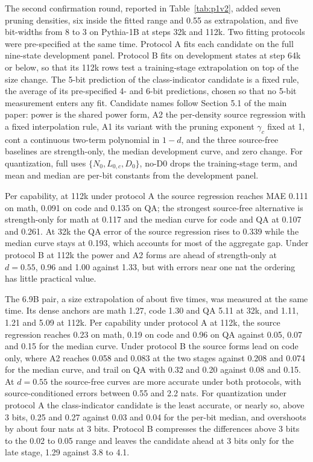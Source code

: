 The second confirmation round, reported in Table~\ref{tab:p1v2}, added seven pruning densities, six inside the fitted range and 0.55 as extrapolation, and five bit-widths from 8 to 3 on Pythia-1B at
steps 32k and 112k. Two fitting protocols were pre-specified at the same time.
Protocol A fits each candidate on the full nine-state development
panel. Protocol B fits on development states at step 64k or below, so
that its 112k rows test a training-stage extrapolation on top of the
size change. The 5-bit prediction of the class-indicator candidate is a
fixed rule, the average of its pre-specified 4- and 6-bit predictions,
chosen so that no 5-bit measurement enters any fit. Candidate names
follow Section 5.1 of the main paper: power is the shared power form, A2 the
per-density source regression with a fixed interpolation rule, A1 its
variant with the pruning exponent $\gamma_c$ fixed at 1, cont a continuous two-term polynomial in $1-d$, and
the three source-free baselines are strength-only, the median
development curve, and zero change. For quantization, full uses
$\{N_0, L_{0,c}, D_0\}$, no-D0 drops the training-stage term, and mean and
median are per-bit constants from the development panel.

Per capability, at 112k under protocol A the source regression reaches
MAE 0.111 on math, 0.091 on code and 0.135 on QA; the strongest source-free alternative is strength-only for math at 0.117 and the median curve for code and QA at 0.107 and 0.261. At 32k the QA error of
the source regression rises to 0.339 while the median curve stays at
0.193, which accounts for most of the aggregate gap. Under protocol B at
112k the power and A2 forms are ahead of strength-only at $d=0.55$, 0.96 and 1.00 against 1.33, but with errors near one nat the ordering
has little practical value.

The 6.9B pair, a size extrapolation of about five times, was measured
at the same time. Its
dense anchors are math 1.27, code 1.30 and QA 5.11 at 32k, and 1.11,
1.21 and 5.09 at 112k. Per capability under protocol A at 112k, the
source regression reaches 0.23 on math, 0.19 on code and 0.96 on QA against 0.05, 0.07 and 0.15 for the median curve. Under protocol B the
source forms lead on code only, where A2 reaches 0.058 and 0.083 at the two stages against 0.208 and 0.074 for the median curve, and trail on QA with 0.32 and 0.20 against 0.08 and 0.15. At $d=0.55$ the source-free curves are
more accurate under both protocols, with source-conditioned errors
between 0.55 and 2.2 nats. For quantization under protocol A the
class-indicator candidate is the least accurate, or nearly so, above 3 bits, 0.25 and 0.27 against 0.03 and 0.04 for the per-bit median, and overshoots by about four nats
at 3 bits. Protocol B compresses the differences above 3 bits to the
0.02 to 0.05 range and leaves the candidate ahead at 3 bits only for the late stage, 1.29 against 3.8 to 4.1.





